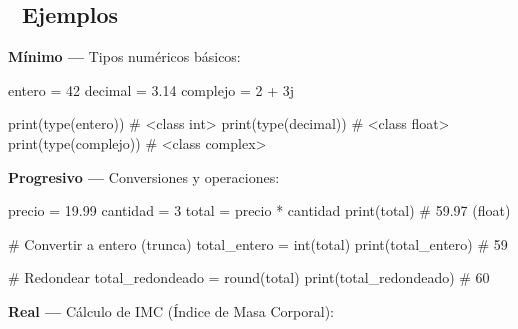 \documentclass[
  doc,
  floatsintext,
  longtable,
  a4paper,
  nolmodern,
  notxfonts,
  notimes,
  12pt,
  colorlinks=true,linkcolor=blue,citecolor=blue,urlcolor=blue]{apa7}
\newenvironment{Shaded}{\begin{snugshade}}{\end{snugshade}}
\newcommand{\BuiltInTok}[1]{\textcolor[rgb]{0.00,0.23,0.31}{#1}}
\newcommand{\CommentTok}[1]{\textcolor[rgb]{0.37,0.37,0.37}{#1}}
\newcommand{\DecValTok}[1]{\textcolor[rgb]{0.68,0.00,0.00}{#1}}
\newcommand{\FloatTok}[1]{\textcolor[rgb]{0.68,0.00,0.00}{#1}}
\newcommand{\NormalTok}[1]{\textcolor[rgb]{0.00,0.23,0.31}{#1}}
\newcommand{\OperatorTok}[1]{\textcolor[rgb]{0.37,0.37,0.37}{#1}}
\newcommand{\OtherTok}[1]{\textcolor[rgb]{0.00,0.23,0.31}{#1}}
\begin{document}
\subsection{🔬 Ejemplos}\label{ejemplos}

\textbf{Mínimo ---} Tipos numéricos básicos:

\begin{Shaded}
\begin{Highlighting}[]
\NormalTok{entero }\OperatorTok{=} \DecValTok{42}
\NormalTok{decimal }\OperatorTok{=} \FloatTok{3.14}
\NormalTok{complejo }\OperatorTok{=} \DecValTok{2} \OperatorTok{+} \OtherTok{3j}

\BuiltInTok{print}\NormalTok{(}\BuiltInTok{type}\NormalTok{(entero))   }\CommentTok{\# \textless{}class \textquotesingle{}int\textquotesingle{}\textgreater{}}
\BuiltInTok{print}\NormalTok{(}\BuiltInTok{type}\NormalTok{(decimal))  }\CommentTok{\# \textless{}class \textquotesingle{}float\textquotesingle{}\textgreater{}}
\BuiltInTok{print}\NormalTok{(}\BuiltInTok{type}\NormalTok{(complejo)) }\CommentTok{\# \textless{}class \textquotesingle{}complex\textquotesingle{}\textgreater{}}
\end{Highlighting}
\end{Shaded}

\textbf{Progresivo ---} Conversiones y operaciones:

\begin{Shaded}
\begin{Highlighting}[]
\NormalTok{precio }\OperatorTok{=} \FloatTok{19.99}
\NormalTok{cantidad }\OperatorTok{=} \DecValTok{3}
\NormalTok{total }\OperatorTok{=}\NormalTok{ precio }\OperatorTok{*}\NormalTok{ cantidad}
\BuiltInTok{print}\NormalTok{(total)  }\CommentTok{\# 59.97 (float)}

\CommentTok{\# Convertir a entero (trunca)}
\NormalTok{total\_entero }\OperatorTok{=} \BuiltInTok{int}\NormalTok{(total)}
\BuiltInTok{print}\NormalTok{(total\_entero)  }\CommentTok{\# 59}

\CommentTok{\# Redondear}
\NormalTok{total\_redondeado }\OperatorTok{=} \BuiltInTok{round}\NormalTok{(total)}
\BuiltInTok{print}\NormalTok{(total\_redondeado)  }\CommentTok{\# 60}
\end{Highlighting}
\end{Shaded}

\textbf{Real ---} Cálculo de IMC (Índice de Masa Corporal):
\end{document}
